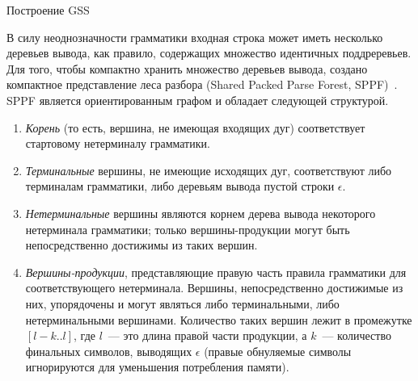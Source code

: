 \begin{algorithm}[H]
\begin{algorithmic}[1]
\caption{Построение GSS}
\label{RNGLRMain}
  \EndIf
\EndFunction
{}
    \EndIf
  \EndIf
\EndFunction
\end{algorithmic}
\end{algorithm}

В силу неоднозначности грамматики входная строка может иметь несколько деревьев вывода, как правило, содержащих множество идентичных поддреревьев. Для того, чтобы компактно хранить множество деревьев вывода, создано компактное представление леса разбора (Shared Packed Parse Forest, SPPF)~\cite{SPPF}. SPPF является ориентированным графом и обладает следующей структурой.
\begin{enumerate}
  \item \emph{Корень} (то есть, вершина, не имеющая входящих дуг) соответствует стартовому нетерминалу грамматики.
  \item \emph{Терминальные} вершины, не имеющие исходящих дуг, соответствуют либо терминалам грамматики, либо деревьям вывода пустой строки $\epsilon$.
  \item \emph{Нетерминальные} вершины являются корнем дерева вывода некоторого нетерминала грамматики; только вершины-продукции могут быть непосредственно достижимы из таких вершин.
  \item \emph{Вершины-продукции}, представляющие правую часть правила грамматики для соответствующего нетерминала. Вершины, непосредственно достижимые из них, упорядочены и могут являться либо терминальными, либо нетерминальными вершинами. Количество таких вершин лежит в промежутке $[l-k..l]$, где $l$~--- это длина правой части продукции, а $k$~--- количество финальных символов, выводящих $\epsilon$ (правые обнуляемые символы игнорируются для уменьшения потребления памяти).
\end{enumerate}

